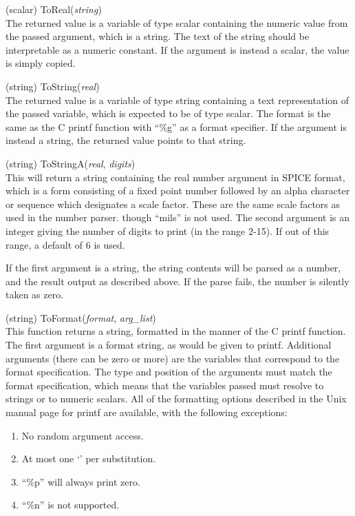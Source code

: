 \begin{description}
\item{(scalar) \vt ToReal({\it string\/})}\\
The returned value is a variable of type scalar containing the
numeric value from the passed argument, which is a string.  The text
of the string should be interpretable as a numeric constant.  If the
argument is instead a scalar, the value is simply copied.

\item{(string) \vt ToString({\it real\/})}\\
The returned value is a variable of type string containing a text
representation of the passed variable, which is expected to be of type
scalar.  The format is the same as the C {\vt printf} function with
``{\vt \%g}'' as a format specifier.  If the argument is instead a
string, the returned value points to that string.

\item{(string) \vt ToStringA({\it real\/}, {\it digits\/})}\\
This will return a string containing the real number argument in SPICE
format, which is a form consisting of a fixed point number followed by
an alpha character or sequence which designates a scale factor.  These
are the same scale factors as used in the number parser.  though
``{\vt mils}'' is not used.  The second argument is an integer giving
the number of digits to print (in the range 2-15).  If out of this
range, a default of 6 is used.

If the first argument is a string, the string contents will be parsed
as a number, and the result output as described above.  If the parse
fails, the number is silently taken as zero.

\item{(string) \vt ToFormat({\it format\/}, {\it arg\_list})}\\
This function returns a string, formatted in the manner of the C {\vt
printf} function.  The first argument is a format string, as would be
given to {\vt printf}.  Additional arguments (there can be zero or
more) are the variables that correspond to the format specification. 
The type and position of the arguments must match the format
specification, which means that the variables passed must resolve to
strings or to numeric scalars.  All of the formatting options
described in the Unix manual page for {\vt printf} are available, with
the following exceptions:
\begin{enumerate}
\item{No random argument access.}
\item{At most one `{\vt *}' per substitution.}
\item{``{\vt \%p}'' will always print zero.}
\item{``{\vt \%n}'' is not supported.}
\end{enumerate}


\end{description}
